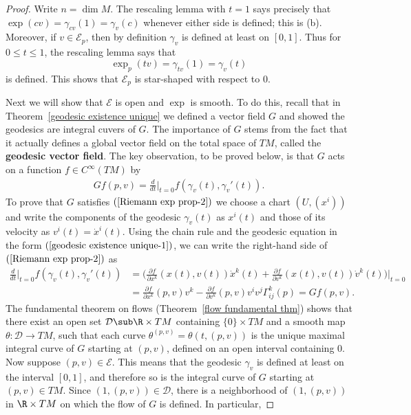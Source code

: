 \begin{proof}
Write $n=\dim M$. The rescaling lemma with $t=1$ says precisely that $\exp(cv)=\gamma_{cv}(1)=\gamma_v(c)$ whenever either side is defined; this is (b). Moreover, if 
$v\in\mathcal{E}_p$, then by definition $\gamma_v$ is defined at least on $[0,1]$. Thus for $0\leq t\leq 1$, the rescaling lemma says that
\[\exp_p(tv)=\gamma_{tv}(1)=\gamma_v(t)\]
is defined. This shows that $\mathcal{E}_p$ is star-shaped with respect to $0$.\par
Next we will show that $\mathcal{E}$ is open and $\exp$ is smooth. To do this, recall that in Theorem~\ref{geodesic existence unique} we defined a vector field $G$ and 
showed the geodesics are integral cuvers of $G$. The importance of $G$ stems from the fact that it actually defines a global vector field on the total space of $TM$, 
called the \textbf{geodesic vector field}. The key observation, to be proved below, is that $G$ acts on a function $f\in C^{\infty}(TM)$ by
\begin{align}\label{Riemann exp prop-2}
Gf(p,v)=\frac{d}{dt}\Big|_{t=0}f(\gamma_v(t),\gamma_v'(t)).
\end{align}
To prove that $G$ satisfies $(\ref{Riemann exp prop-2})$ we choose a chart $(U,(x^i))$ and write the components of the geodesic $\gamma_v(t)$ as $x^i(t)$ and those of 
its velocity as $v^i(t)=\dot{x}^i(t)$. Using the chain rule and the geodesic equation in the form $(\ref{geodesic existence unique-1})$, we can write the right-hand side of $(\ref{Riemann exp prop-2})$ 
as
\begin{align*}
\frac{d}{dt}\Big|_{t=0}f(\gamma_v(t),\gamma_v'(t))&=\Big(\frac{\partial f}{\partial x^k}(x(t),v(t))\dot{x}^k(t)+\frac{\partial f}{\partial v^k}(x(t),v(t))\dot{v}^k(t)\Big)\Big|_{t=0}\\
&=\frac{\partial f}{\partial x^k}(p,v)v^k-\frac{\partial f}{\partial v^k}(p,v)v^iv^j\Gamma_{ij}^k(p)=Gf(p,v).
\end{align*}
The fundamental theorem on flows (Theorem~\ref{flow fundamental thm}) shows that there exist an open set $\mathcal{D}\sub\R\times TM$ containing $\{0\}\times TM$ and a smooth map $\theta:\mathcal{D}\to TM$, 
such that each curve $\theta^{(p,v)}=\theta(t,(p,v))$ is the unique maximal integral curve of $G$ starting at $(p,v)$, defined on an open interval containing $0$. Now 
suppose $(p,v)\in\mathcal{E}$. This means that the geodesic $\gamma_v$ is defined at least on the interval $[0,1]$, and therefore so is the integral curve of $G$ 
starting at $(p,v)\in TM$. Since $(1,(p,v))\in\mathcal{D}$, there is a neighborhood of $(1,(p,v))$ in $\R\times TM$ on which the flow of $G$ is defined. In particular, 

\end{proof}
